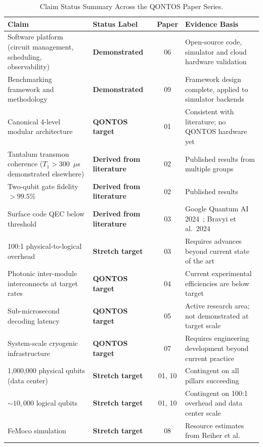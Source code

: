 \documentclass[conference]{IEEEtran}
\begin{document}
\begin{table}[htbp]
\centering
\caption{Claim Status Summary Across the QONTOS Paper Series.}
\label{tab:claim_status}
\begin{tabular}{p{5cm}lcp{5cm}}
\toprule
\textbf{Claim} & \textbf{Status Label} & \textbf{Paper} & \textbf{Evidence Basis} \\
\midrule
Software platform (circuit management, scheduling, observability) & \textbf{Demonstrated} & 06 & Open-source code, simulator and cloud hardware validation \\
Benchmarking framework and methodology & \textbf{Demonstrated} & 09 & Framework design complete, applied to simulator backends \\
Canonical 4-level modular architecture & \textbf{QONTOS target} & 01 & Consistent with literature; no QONTOS hardware yet \\
Tantalum transmon coherence ($T_1 > 300$~$\mu$s demonstrated elsewhere) & \textbf{Derived from literature} & 02 & Published results from multiple groups \\
Two-qubit gate fidelity $> 99.5\%$ & \textbf{Derived from literature} & 02 & Published results~\cite{ibm2024, googleqai2024} \\
Surface code QEC below threshold & \textbf{Derived from literature} & 03 & Google Quantum AI 2024~\cite{googleqai2024}; Bravyi et al.\ 2024~\cite{bravyi2024} \\
100:1 physical-to-logical overhead & \textbf{Stretch target} & 03 & Requires advances beyond current state of the art \\
Photonic inter-module interconnects at target rates & \textbf{QONTOS target} & 04 & Current experimental efficiencies are below target \\
Sub-microsecond decoding latency & \textbf{QONTOS target} & 05 & Active research area; not demonstrated at target scale \\
System-scale cryogenic infrastructure & \textbf{QONTOS target} & 07 & Requires engineering development beyond current practice \\
1,000,000 physical qubits (data center) & \textbf{Stretch target} & 01, 10 & Contingent on all pillars succeeding \\
${\sim}10{,}000$ logical qubits & \textbf{Stretch target} & 01, 10 & Contingent on 100:1 overhead and data center scale \\
FeMoco simulation & \textbf{Stretch target} & 08 & Resource estimates from Reiher et al.~\cite{reiher2017} \\
\bottomrule
\end{tabular}
\end{table}
\end{document}
